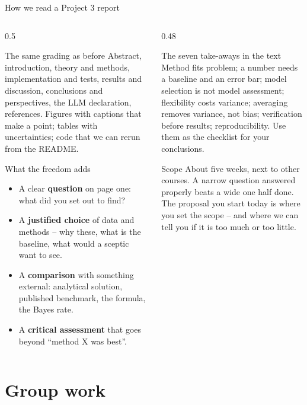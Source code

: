 \documentclass[10pt,aspectratio=169]{beamer}
\begin{document}
\begin{frame}{How we read a Project 3 report}
\scriptsize
\begin{columns}[T]
\begin{column}{0.5\textwidth}
\begin{block}{The same grading as before}
Abstract, introduction, theory and methods, implementation and tests,
results and discussion, conclusions and perspectives, the LLM declaration,
references.  Figures with captions that make a point; tables with
uncertainties; code that we can rerun from the README.
\end{block}
\begin{block}{What the freedom adds}
\begin{itemize}
  \item A clear \textbf{question} on page one: what did you set out to find?
  \item A \textbf{justified choice} of data and methods -- why these, what
        is the baseline, what would a sceptic want to see.
  \item A \textbf{comparison} with something external: analytical solution,
        published benchmark, the formula, the Bayes rate.
  \item A \textbf{critical assessment} that goes beyond ``method X was best''.
\end{itemize}
\end{block}
\end{column}
\begin{column}{0.48\textwidth}
\begin{block}{The seven take-aways in the text}
Method fits problem; a number needs a baseline and an error bar; model
selection is not model assessment; flexibility costs variance; averaging
removes variance, not bias; verification before results; reproducibility.
Use them as the checklist for your conclusions.
\end{block}
\begin{block}{Scope}
About five weeks, next to other courses.  A narrow question answered
properly beats a wide one half done.  The proposal you start today is where
you set the scope -- and where we can tell you if it is too much or too
little.
\end{block}
\end{column}
\end{columns}
\end{frame}

\section{Group work}
\end{document}
